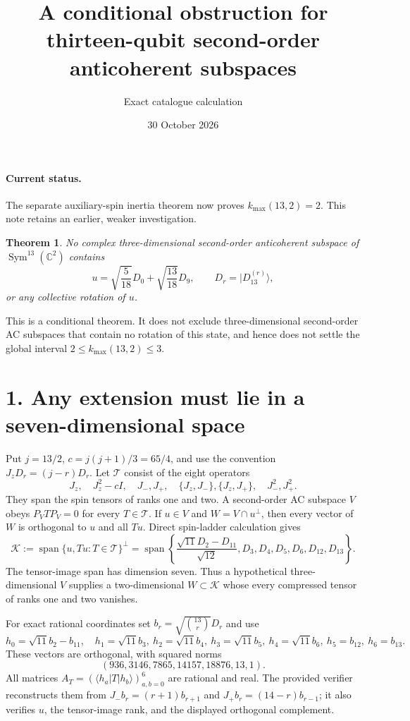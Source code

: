 \documentclass[11pt]{article}
\newtheorem{theorem}{Theorem}
\newcommand{\Span}{\operatorname{span}}
\begin{document}
\paragraph{Current status.} The separate auxiliary-spin inertia theorem now proves $k_{\max}(13,2)=2$. This note retains an earlier, weaker investigation.

\title{A conditional obstruction for thirteen-qubit second-order anticoherent subspaces}
\author{Exact catalogue calculation}
\date{30 October 2026}
\maketitle
\begin{theorem}
No complex three-dimensional second-order anticoherent subspace of
$\operatorname{Sym}^{13}(\mathbb C^2)$ contains
\[
 u=\sqrt{\frac5{18}}D_0+\sqrt{\frac{13}{18}}D_9,
 \qquad D_r=|D_{13}^{(r)}\rangle,
\]
or any collective rotation of $u$.
\end{theorem}
This is a conditional theorem. It does not exclude three-dimensional
second-order AC subspaces that contain no rotation of this state, and hence
does not settle the global interval $2\le k_{\max}(13,2)\le3$.

\section*{1. Any extension must lie in a seven-dimensional space}
Put $j=13/2$, $c=j(j+1)/3=65/4$, and use the convention
$J_zD_r=(j-r)D_r$. Let $\mathcal T$ consist of the eight operators
\[
 J_z,\quad J_z^2-cI,\quad J_-,J_+,\quad
 \{J_z,J_-\},\{J_z,J_+\},\quad J_-^2,J_+^2.
\]
They span the spin tensors of ranks one and two. A second-order AC
subspace $V$ obeys $P_VTP_V=0$ for every $T\in\mathcal T$.
If $u\in V$ and $W=V\cap u^\perp$, then every vector of $W$ is
orthogonal to $u$ and all $Tu$. Direct spin-ladder calculation gives
\[
 \mathcal K:=\Span\{u,Tu:T\in\mathcal T\}^{\perp}
 =\Span\left\{
 \frac{\sqrt{11}D_2-D_{11}}{\sqrt{12}},
 D_3,D_4,D_5,D_6,D_{12},D_{13}\right\}.
\]
The tensor-image span has dimension seven. Thus a hypothetical
three-dimensional $V$ supplies a two-dimensional $W\subset\mathcal K$
whose every compressed tensor of ranks one and two vanishes.

For exact rational coordinates set $b_r=\sqrt{\binom{13}{r}}D_r$ and use
\[
 h_0=\sqrt{11}b_2-b_{11},\quad
 h_1=\sqrt{11}b_3,\ h_2=\sqrt{11}b_4,\
 h_3=\sqrt{11}b_5,\ h_4=\sqrt{11}b_6,\
 h_5=b_{12},\ h_6=b_{13}.
\]
These vectors are orthogonal, with squared norms
\[
 (936,3146,7865,14157,18876,13,1).
\]
All matrices $A_T=(\langle h_a|T|h_b\rangle)_{a,b=0}^6$ are rational
and real. The provided verifier reconstructs them from
$J_-b_r=(r+1)b_{r+1}$ and $J_+b_r=(14-r)b_{r-1}$; it also verifies
$u$, the tensor-image rank, and the displayed orthogonal complement.
\end{document}

